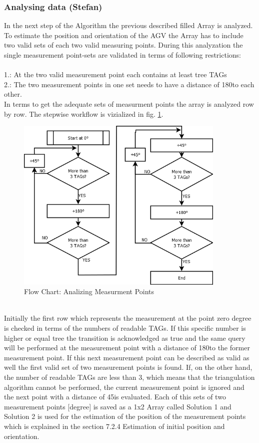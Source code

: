 \subsubsection{Analysing data (Stefan)}
In the next step of the Algorithm the previous described filled Array is analyzed. To estimate the position and orientation of the AGV the Array has to include two valid sets of each two valid measuring points.  During this analyzation the single measurement point-sets are validated in terms of following restrictions:\\\\
1.: At the two valid measurement point each contains at least tree TAGs\\
2.: The two measurement points in one set needs to have a distance of 180\textdegree  to each other.
\pagebreak\\
In terms to get the adequate sets of measurment points the array is analyzed row by row. The stepwise workflow is vizialized in fig. \ref{Analyze_Array}.\\
\begin{figure}[!htbp]
\centering
\includegraphics[width = 10cm]{Pictures/AnalyzeArray}
\caption{Flow Chart: Analizing Measurment Points}
\label{Analyze_Array}
\end{figure}\\
Initially the first row which represents the measurement at the point zero degree is checked in terms of the numbers of readable TAGs. If this specific number is higher or equal tree the transition is acknowledged as true and the same query will be performed at the measurement point with a distance of 180\textdegree  to the former measurement point. If this next measurement point can be described as valid as well the first valid set of two measurement points is found. If, on the other hand, the number of readable TAGs are less than 3, which means that the triangulation algorithm cannot be performed, the current measurement point is ignored and the next point with a distance of 45\textdegree   is evaluated.
Each of this sets of two measurement points [degree] is saved as a 1x2 Array called Solution 1 and Solution 2 is used for the estimation of the position of the measurement points which is explained in the section 7.2.4 Estimation of initial position and orientation.\\
%
